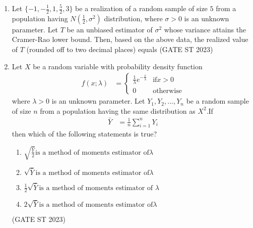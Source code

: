 \begin{enumerate}[label=\thechapter.\arabic*,ref=\thechapter.\theenumi]
\item Let $\{-1, -\frac{1}{2}, 1, \frac{5}{2}, 3\}$ be a realization of a random sample of size $5$ from a population having $N\left(\frac{1}{2}, \sigma^2\right)$ distribution, where $\sigma > 0$ is an unknown parameter. Let $T$ be an unbiased estimator of $\sigma^2$ whose variance attains the Cramer-Rao lower bound. Then, based on the above data, the realized value of $T$ (rounded off to two decimal places) equals
\hfill (GATE ST 2023)

\item Let $X$ be a random variable with probability density function
\begin{align}
\label{eq:22/2023/1}f(x;\lambda)&=
\begin{cases}
\frac{1}{\lambda}e^{-\frac{x}{\lambda}} & \text{if} x>0\\
0 & \text{otherwise}
\end{cases}
\end{align}
where $\lambda > 0$ is an unknown parameter. Let $Y_1, Y_2,...,Y_n$ be a random sample of
size $n$ from a population having the same distribution as $X^2$.If
\begin{align}
\label{eq:22/2023/2}\bar{Y} &= \frac{1}{n}\sum_{i=1}^n Y_i
\end{align}
then which of the following statements is true?
\begin{enumerate}
\item \label{eq:22/2023/3}$\sqrt{\frac{\bar{Y}}{2}} \text{is a method of moments estimator of}         \lambda$
\item $\sqrt{\bar{Y}} \text{is a method of moments estimator of}\lambda$
\item ${\frac{1}{2}\sqrt{\bar{Y}}} \text{is a method of moments estimator of }\lambda$
\item $2\sqrt{\bar{Y}} \text{is a method of moments estimator of} \lambda$
\end{enumerate}
\hfill(GATE ST 2023)\\

\end{enumerate}
